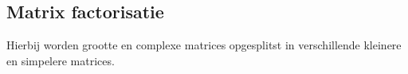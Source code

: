 \subsection{Matrix factorisatie}
Hierbij worden grootte en complexe matrices opgesplitst in verschillende kleinere en simpelere matrices.






